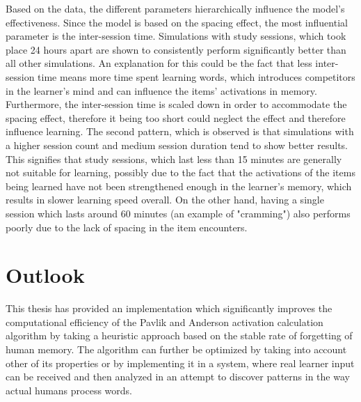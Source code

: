 \documentclass[a4paper]{report}
\begin{document}
Based on the data, the different parameters hierarchically influence the model's effectiveness. Since the model is based on the spacing effect, the most influential parameter is the inter-session time. Simulations with study sessions, which took place 24 hours apart are shown to consistently perform significantly better than all other simulations. An explanation for this could be the fact that less inter-session time means more time spent learning words, which introduces competitors in the learner's mind and can influence the items' activations in memory. Furthermore, the inter-session time is scaled down in order to accommodate the spacing effect, therefore it being too short could neglect the effect and therefore influence learning. The second pattern, which is observed is that simulations with a higher session count and medium session duration tend to show better results. This signifies that study sessions, which last less than 15 minutes are generally not suitable for learning, possibly due to the fact that the activations of the items being learned have not been strengthened enough in the learner's memory, which results in slower learning speed overall. On the other hand, having a single session which lasts around 60 minutes (an example of "cramming") also performs poorly due to the lack of spacing in the item encounters.


\chapter{Outlook}
This thesis has provided an implementation which significantly improves the computational efficiency of the Pavlik and Anderson activation calculation algorithm by taking a heuristic approach based on the stable rate of forgetting of human memory. The algorithm can further be optimized by taking into account other of its properties or by implementing it in a system, where real learner input can be received and then analyzed in an attempt to discover patterns in the way actual humans process words.
\end{document}
